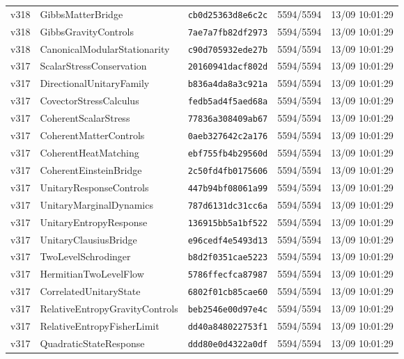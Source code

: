 \documentclass[11pt]{article}
\theoremstyle{definition}\newtheorem{deriv}{Derivation}
\begin{document}
{\begin{longtable}{@{}lllll@{}}
v318 & GibbsMatterBridge & \texttt{cb0d25363d8e6c2c} & 5594/5594 & 13/09 10:01:29 \\
v318 & GibbsGravityControls & \texttt{7ae7a7fb82df2973} & 5594/5594 & 13/09 10:01:29 \\
v318 & CanonicalModularStationarity & \texttt{c90d705932ede27b} & 5594/5594 & 13/09 10:01:29 \\
v317 & ScalarStressConservation & \texttt{20160941dacf802d} & 5594/5594 & 13/09 10:01:29 \\
v317 & DirectionalUnitaryFamily & \texttt{b836a4da8a3c921a} & 5594/5594 & 13/09 10:01:29 \\
v317 & CovectorStressCalculus & \texttt{fedb5ad4f5aed68a} & 5594/5594 & 13/09 10:01:29 \\
v317 & CoherentScalarStress & \texttt{77836a308409ab67} & 5594/5594 & 13/09 10:01:29 \\
v317 & CoherentMatterControls & \texttt{0aeb327642c2a176} & 5594/5594 & 13/09 10:01:29 \\
v317 & CoherentHeatMatching & \texttt{ebf755fb4b29560d} & 5594/5594 & 13/09 10:01:29 \\
v317 & CoherentEinsteinBridge & \texttt{2c50fd4fb0175606} & 5594/5594 & 13/09 10:01:29 \\
v317 & UnitaryResponseControls & \texttt{447b94bf08061a99} & 5594/5594 & 13/09 10:01:29 \\
v317 & UnitaryMarginalDynamics & \texttt{787d6131dc31cc6a} & 5594/5594 & 13/09 10:01:29 \\
v317 & UnitaryEntropyResponse & \texttt{136915bb5a1bf522} & 5594/5594 & 13/09 10:01:29 \\
v317 & UnitaryClausiusBridge & \texttt{e96cedf4e5493d13} & 5594/5594 & 13/09 10:01:29 \\
v317 & TwoLevelSchrodinger & \texttt{b8d2f0351cae5223} & 5594/5594 & 13/09 10:01:29 \\
v317 & HermitianTwoLevelFlow & \texttt{5786ffecfca87987} & 5594/5594 & 13/09 10:01:29 \\
v317 & CorrelatedUnitaryState & \texttt{6802f01cb85cae60} & 5594/5594 & 13/09 10:01:29 \\
v317 & RelativeEntropyGravityControls & \texttt{beb2546e00d97e4c} & 5594/5594 & 13/09 10:01:29 \\
v317 & RelativeEntropyFisherLimit & \texttt{dd40a848022753f1} & 5594/5594 & 13/09 10:01:29 \\
v317 & QuadraticStateResponse & \texttt{ddd80e0d4322a0df} & 5594/5594 & 13/09 10:01:29 \\

\end{longtable}}
\end{document}

